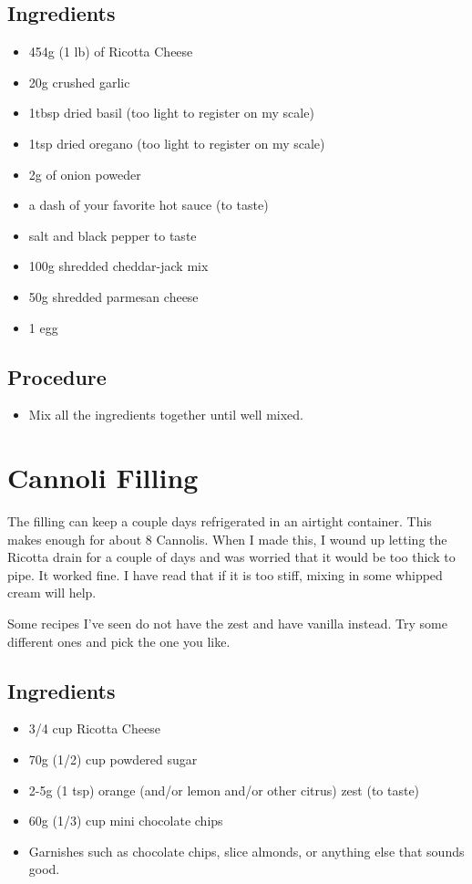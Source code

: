 \documentclass[10pt, openany]{book}
\begin{document}
\subsection{Ingredients}
\begin{itemize}
  \item 454g (1 lb) of Ricotta Cheese
  \item 20g crushed garlic
  \item 1tbsp dried basil (too light to register on my scale)
  \item 1tsp dried oregano (too light to register on my scale)
  \item 2g of onion poweder
  \item a dash of your favorite hot sauce (to taste)
  \item salt and black pepper to taste
  \item 100g shredded cheddar-jack mix
  \item 50g shredded parmesan cheese
  \item 1 egg
\end{itemize}
\subsection{Procedure}
\begin{itemize}
  \item Mix all the ingredients together until well mixed.
\end{itemize}

\section{Cannoli Filling}
\label{extra:CannoliFilling}
The filling can keep a couple days refrigerated in an airtight container.  This makes enough for about 8 Cannolis.  When I made this, I wound up letting the Ricotta drain for a couple of days and was worried that it would be too thick to pipe.  It worked fine.  I have read that if it is too stiff, mixing in some whipped cream will help.

Some recipes I've seen do not have the zest and have vanilla instead.  Try some different ones and pick the one you like.
\subsection{Ingredients}
\begin{itemize}
  \item 3/4 cup Ricotta Cheese
  \item 70g (1/2) cup powdered sugar
  \item 2-5g (1 tsp) orange (and/or lemon and/or other citrus) zest (to taste)
  \item 60g (1/3) cup mini chocolate chips
  \item Garnishes such as chocolate chips, slice almonds, or anything else that sounds good.
\end{itemize}
\end{document}
